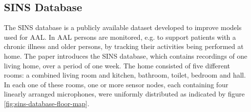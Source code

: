 \subsection{SINS Database}
\label{sub:SINS-Database}
The \gls{SINS} database is a publicly available dataset developed to improve models used for \gls{AAL}. In \gls{AAL} persons are monitored, e.g. to support patients with a chronic illness and older persons, by tracking their activities being performed at home.
\newline
\newline
The paper \cite{dekkers_sins_2017} introduces the \gls{SINS} database, which contains recordings of one living home, over a period of one week. The home consisted of five different rooms: a combined living room and kitchen, bathroom, toilet, bedroom and hall. In each one of these rooms, one or more sensor nodes, each containing four linearly arranged microphones, were uniformly distributed as indicated by figure \ref{fig:sins-database-floor-map}.

